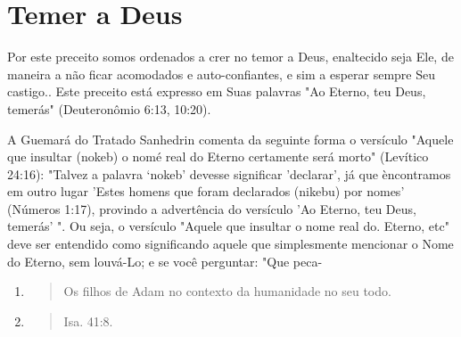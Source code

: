 \section{Temer a Deus}

Por este preceito somos ordenados a crer no temor a Deus, enalteci­do
seja Ele, de maneira a não ficar acomodados e auto-confiantes, e sim a
espe­rar sempre Seu castigo.. Este preceito está expresso em Suas
palavras "Ao Eter­no, teu Deus, temerás" (Deuteronômio 6:13, 10:20).

A Guemará do Tratado Sanhedrin comenta da seguinte forma o ver­sículo
"Aquele que insultar (nokeb) o nomé real do Eterno certamente será
mor­to" (Levítico 24:16): "Talvez a palavra `nokeb' devesse significar
'declarar', já que èncontramos em outro lugar 'Estes homens que foram
declarados (nikebu) por nomes' (Números 1:17), provindo a advertência do
versículo 'Ao Eterno, teu Deus, temerás' ". Ou seja, o versículo "Aquele
que insultar o nome real do. Eterno, etc" deve ser
entendido como significando aquele que simplesmente mencionar o Nome do
Eterno, sem louvá-Lo; e se você perguntar: "Que peca-

\begin{enumerate}
\def\labelenumi{\arabic{enumi}.}
\setcounter{enumi}{26}
\item
 \begin{quote}
 Os filhos de Adam no contexto da humanidade no seu todo.
 \end{quote}
\item
 \begin{quote}
 Isa. 41:8.
 \end{quote}
\end{enumerate}

